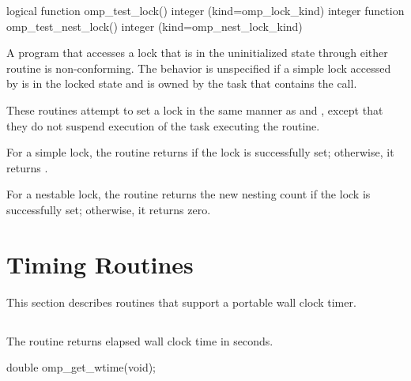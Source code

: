 \fortranspecificstart
\begin{boxedcode}
logical function omp\_test\_lock()
integer (kind=omp\_lock\_kind) 
integer function omp\_test\_nest\_lock()
integer (kind=omp\_nest\_lock\_kind) 
\end{boxedcode}
\fortranspecificend

\constraints
A program that accesses a lock that is in the uninitialized state through either routine is 
non-conforming. The behavior is unspecified if a simple lock accessed by 
 is in the locked state and is owned by the task that contains the call.

\effect 
These routines attempt to set a lock in the same manner as  and 
, except that they do not suspend execution of the task 
executing the routine.

For a simple lock, the  routine returns  if the lock is successfully 
set; otherwise, it returns .

For a nestable lock, the  routine returns the new nesting count 
if the lock is successfully set; otherwise, it returns zero.







\section{Timing Routines}
\label{sec:Timing Routines}
This section describes routines that support a portable wall clock timer.









\subsection{}
\label{subsec:omp_get_wtime}
\summary
The  routine returns elapsed wall clock time in seconds.

\format
\ccppspecificstart
\begin{boxedcode}
double omp\_get\_wtime(void);
\end{boxedcode}
\ccppspecificend

